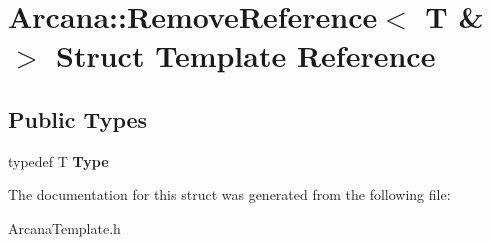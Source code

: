 \hypertarget{struct_arcana_1_1_remove_reference_3_01_t_01_6_4}{}\section{Arcana\+:\+:Remove\+Reference$<$ T \&$>$ Struct Template Reference}
\label{struct_arcana_1_1_remove_reference_3_01_t_01_6_4}
\subsection*{Public Types}
\begin{DoxyCompactItemize}
\item 
\mbox{\label{struct_arcana_1_1_remove_reference_3_01_t_01_6_4_a8f3f4fdb2bad28897a891085ebbcfdee}} 
typedef T {\bfseries Type}
\end{DoxyCompactItemize}


The documentation for this struct was generated from the following file\+:\begin{DoxyCompactItemize}
\item 
Arcana\+Template.\+h\end{DoxyCompactItemize}
